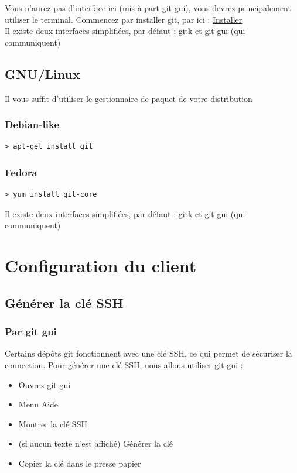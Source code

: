 Vous n'aurez pas d'interface ici (mis à part git gui), vous devrez principalement utiliser le terminal.
Commencez par installer git, par ici : \href{http://code.google.com/p/git-osx-installer}{Installer}\\

Il existe deux interfaces simplifiées, par défaut : gitk et git gui (qui communiquent)

\subsection{GNU/Linux}
Il vous suffit d'utiliser le gestionnaire de paquet de votre distribution
\subsubsection{Debian-like}
\begin{verbatim}
> apt-get install git
\end{verbatim}
\subsubsection{Fedora}
\begin{verbatim}
> yum install git-core
\end{verbatim}

Il existe deux interfaces simplifiées, par défaut : gitk et git gui (qui communiquent)

\section{Configuration du client}
\subsection{Générer la clé SSH}
\subsubsection{Par git gui}

Certains dépôts git fonctionnent avec une clé SSH, ce qui permet de sécuriser la connection.
Pour générer une clé SSH, nous allons utiliser git gui :

\begin{itemize}
	\item Ouvrez git gui
	\item Menu Aide
	\item Montrer la clé SSH
	\item (si aucun texte n'est affiché) Générer la clé
	\item Copier la clé dans le presse papier\\
\end{itemize}

